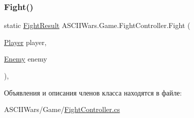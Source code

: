 \hypertarget{class_a_s_c_i_i_wars_1_1_game_1_1_fight_controller_a9c168181e851d6ee67ac6d27ca73089a}{}\label{class_a_s_c_i_i_wars_1_1_game_1_1_fight_controller_a9c168181e851d6ee67ac6d27ca73089a} 
\subsubsection{\texorpdfstring{Fight()}{Fight()}}
{\footnotesize\ttfamily static \hyperlink{namespace_a_s_c_i_i_wars_1_1_game_a26bea755310826ad76e09cc1ce0c5ecd}{Fight\+Result} A\+S\+C\+I\+I\+Wars.\+Game.\+Fight\+Controller.\+Fight (\begin{DoxyParamCaption}\item[{\hyperlink{class_a_s_c_i_i_wars_1_1_game_1_1_player}{Player}}]{player,  }\item[{\hyperlink{class_a_s_c_i_i_wars_1_1_game_1_1_enemy}{Enemy}}]{enemy }\end{DoxyParamCaption})\hspace{0.3cm}{\ttfamily [inline]}, {\ttfamily [static]}}



Объявления и описания членов класса находятся в файле\+:\begin{DoxyCompactItemize}
\item 
A\+S\+C\+I\+I\+Wars/\+Game/\hyperlink{_fight_controller_8cs}{Fight\+Controller.\+cs}\end{DoxyCompactItemize}

